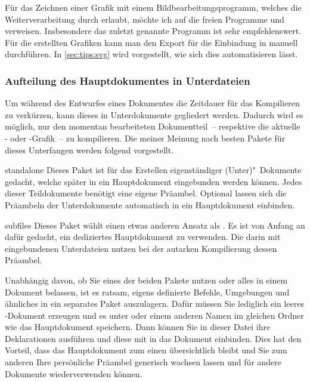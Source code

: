 Für das Zeichnen einer Grafik mit einem Bildbearbeitungsprogramm, welches die 
Weiterverarbeitung durch  erlaubt, möchte ich auf die freien 
Programme  und  verweisen. 
Insbesondere das zuletzt genannte Programm ist sehr empfehlenswert. Für die 
erstellten Grafiken kann man den Export für die Einbindung in  
manuell durchführen. In \autoref{sec:tips:svg} wird vorgestellt, wie sich dies 
automatisieren lässt.

\subsubsection{Aufteilung des Hauptdokumentes in Unterdateien}
Um während des Entwurfes eines Dokumentes die Zeitdauer für das Kompilieren zu 
verkürzen, kann dieses in Unterdokumente gegliedert werden. Dadurch wird es 
möglich, nur den momentan bearbeiteten Dokumentteil~-- respektive die aktuelle 
- oder -Grafik~-- zu kompilieren. Die meiner 
Meinung nach besten Pakete für dieses Unterfangen werden folgend vorgestellt.
%
\begin{packages}
\item[standalone]
  Dieses Paket ist für das Erstellen eigenständiger (Unter)"~Dokumente gedacht, 
  welche später in ein Hauptdokument eingebunden werden können. Jedes dieser 
  Teildokumente benötigt eine eigene Präambel. Optional lassen sich die 
  Präambeln der Unterdokumente automatisch in ein Hauptdokument einbinden.
\item[subfiles]
  Dieses Paket wählt einen etwas anderen Ansatz als . Es 
  ist von Anfang an dafür gedacht, ein dediziertes Hauptdokument zu verwenden. 
  Die darin mit  eingebundenen Unterdateien nutzen bei der 
  autarken Kompilierung dessen Präambel.
\end{packages}
%
Unabhängig davon, ob Sie eines der beiden Pakete nutzen oder alles in einem 
Dokument belassen, ist es ratsam, eigens definierte Befehle, Umgebungen und 
ähnliches in ein separates Paket auszulagern. Dafür müssen Sie lediglich ein 
leeres -Dokument erzeugen und es unter  
oder einem anderen Namen im gleichen Ordner wie das Hauptdokument speichern. 
Dann können Sie in dieser Datei ihre Deklarationen ausführen und diese mit 
 in das Dokument einbinden. Dies hat 
den Vorteil, dass das Hauptdokument zum einen übersichtlich bleibt und Sie zum 
anderen Ihre persönliche Präambel generisch wachsen lassen und für andere 
Dokumente wiederverwenden können.

